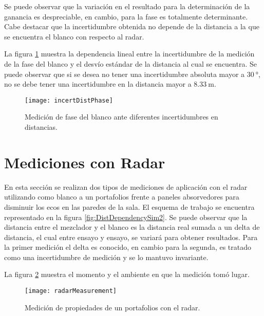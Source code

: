 Se puede observar que la variación en el resultado para la determinación de la ganancia es despreciable, en cambio, para la fase es totalmente determinante. Cabe destacar que la incertidumbre obtenida no depende de la distancia a la que se encuentra el blanco con respecto al radar.

La figura \ref{fig:incertDistSim} muestra la dependencia lineal entre la incertidumbre de la medición de la fase del blanco y el desvío estándar de la distancia al cual se encuentra. Se puede observar que si se desea no tener una incertidumbre absoluta mayor a $\SI{30}{\degree}$, no se debe tener una incertidumbre en la distancia mayor a $\SI{8.33}{\meter}$.
\begin{figure}[H]
  \centering
  \texttt{[image: incertDistPhase]}
  \caption{Medición de fase del blanco ante diferentes incertidumbres en distancias.}
  \label{fig:incertDistSim}
\end{figure}


\section{Mediciones con Radar}

En esta sección se realizan dos tipos de mediciones de aplicación con el radar utilizando como blanco a un portafolios frente a paneles absorvedores para disminuir los ecos en las paredes de la sala. El esquema de trabajo se encuentra representado en la figura \ref{fig:DistDependencySim2}. Se puede observar que la distancia entre el mezclador y el blanco es la distancia real sumada a un delta de distancia, el cual entre ensayo y ensayo, se variará para obtener resultados. Para la primer medición el delta es conocido, en cambio para la segunda, es tratado como una incertidumbre de medición y se lo mantuvo invariante.

La figura \ref{fig:radarMeasurement} muestra el momento y el ambiente en que la medición tomó lugar.
\begin{figure}[htb]
  \centering
  \texttt{[image: radarMeasurement]}
  \caption{Medición de propiedades de un portafolios con el radar.}
  \label{fig:radarMeasurement}
\end{figure}


